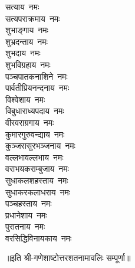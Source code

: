 \begin{multicols}{2}
\begin{flushleft}
सत्याय~नमः\\
सत्यपराक्रमाय~नमः\\
शुभाङ्गाय~नमः\hfill{}\\
शुभ्रदन्ताय~नमः\\
शुभदाय~नमः\\
शुभविग्रहाय~नमः\\
पञ्चपातकनाशिने~नमः\\
पार्वतीप्रियनन्दनाय~नमः\\
विश्वेशाय~नमः\\
विबुधाराध्यपदाय~नमः\\
वीरवराग्रगाय~नमः\\
कुमारगुरुवन्द्याय~नमः\\
कुञ्जरासुरभञ्जनाय~नमः\hfill{}\\
वल्लभावल्लभाय~नमः\\
वराभयकराम्बुजाय~नमः\\
सुधाकलशहस्ताय~नमः\\
सुधाकरकलाधराय~नमः\\
पञ्चहस्ताय~नमः\\
प्रधानेशाय~नमः\\
पुरातनाय~नमः\\
वरसिद्धिविनायकाय~नमः\\
\end{flushleft}
\end{multicols}
॥इति श्री-गणेशाष्टोत्तरशतनामावलिः सम्पूर्णा॥
